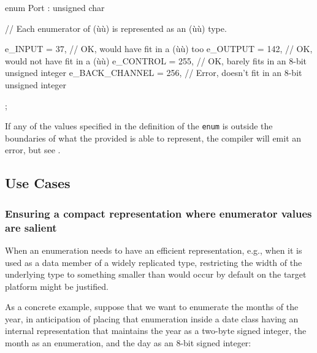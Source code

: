 \begin{emcppslisting}
enum Port : unsigned char
{
    // Each enumerator of (ù{}ù) is represented as an (ù{}ù) type.

    e_INPUT        =  37,  // OK, would have fit in a (ù{}ù) too
    e_OUTPUT       = 142,  // OK, would not have fit in a (ù{}ù)
    e_CONTROL      = 255,  // OK, barely fits in an 8-bit unsigned integer
    e_BACK_CHANNEL = 256,  // Error, doesn't fit in an 8-bit unsigned integer
};
\end{emcppslisting}

\noindent If any of the values specified in the definition of the \lstinline!enum! is
outside the boundaries of what the provided  is
able to represent, the compiler will emit an error, but see .

\subsection[Use Cases]{Use Cases}\label{use-cases}

\subsubsection[Ensuring a compact representation where enumerator values are salient]{Ensuring a compact representation where enumerator values are salient}\label{ensuring-a-compact-representation-where-enumerator-values-are-salient}

When an enumeration needs to have an efficient representation, e.g.,
when it is used as a data member of a widely replicated type,
restricting the width of the underlying type to something smaller than
would occur by default on the target platform might be justified.

As a concrete example, suppose that we want to enumerate the months of
the year, in anticipation of placing that enumeration
inside a date class having an internal representation that maintains the
year as a two-byte signed integer, the month as an enumeration, and the
day as an 8-bit signed integer:

